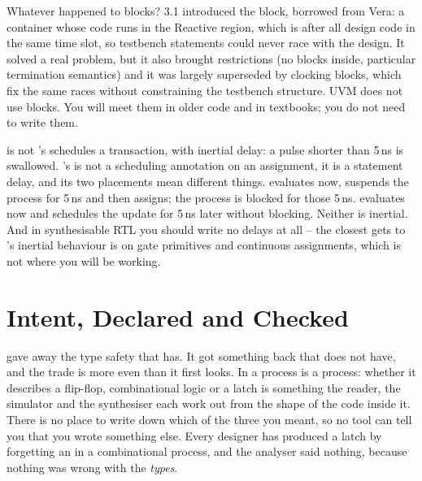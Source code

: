 \begin{notebox}{Whatever happened to  blocks?}
\SV{} 3.1 introduced the  block, borrowed from
Vera: a container whose code runs in the Reactive region, which is after all
design code in the same time slot, so testbench statements could never race
with the design. It solved a real problem, but it also brought restrictions
(no  blocks inside, particular termination semantics) and it was
largely superseded by clocking blocks, which fix the same races without
constraining the testbench structure. UVM does not use  blocks.
You will meet them in older code and in textbooks; you do not need to write
them.
\end{notebox}

\begin{gotcha}{ is not \code{\#}}
\VHDL{}'s  schedules a transaction, with inertial
delay: a pulse shorter than 5\,ns is swallowed. \SV{}'s \code{\#} is not a
scheduling annotation on an assignment, it is a statement delay, and its two
placements mean different things.  evaluates  now,
suspends the process for 5\,ns and then assigns; the process is blocked for
those 5\,ns.  evaluates  now and schedules the update
for 5\,ns later without blocking. Neither is inertial. And in synthesisable
RTL you should write no \code{\#} delays at all -- the closest \SV{} gets to
\VHDL{}'s inertial behaviour is on gate primitives and continuous assignments,
which is not where you will be working.
\end{gotcha}

\section{Intent, Declared and Checked}
\label{sec:philosophy:intent}

\SV{} gave away the type safety that \VHDL{} has. It got something back that
\VHDL{} does not have, and the trade is more even than it first looks. In
\VHDL{} a process is a process: whether it describes a flip-flop, combinational
logic or a latch is something the reader, the simulator and the synthesiser
each work out from the shape of the code inside it. There is no place to write
down which of the three you meant, so no tool can tell you that you wrote
something else. Every \VHDL{} designer has produced a latch by forgetting an
 in a combinational process, and the analyser said nothing, because
nothing was wrong with the \emph{types}.

